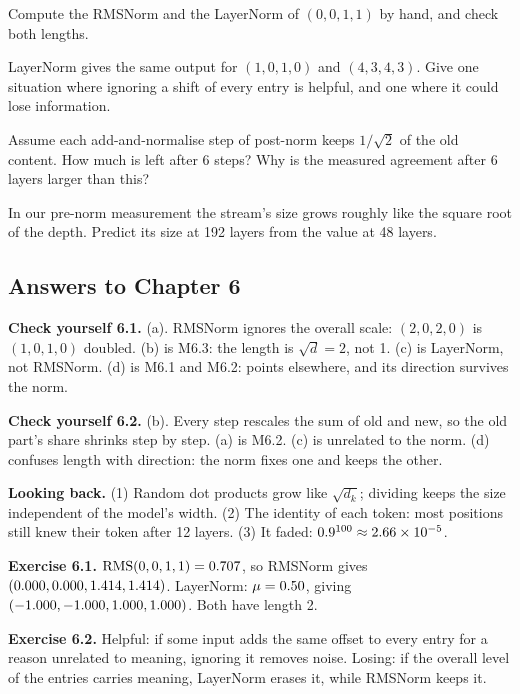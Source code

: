 \begin{exercise}
Compute the RMSNorm and the LayerNorm of $(0,0,1,1)$ by hand, and check both lengths.
\end{exercise}
\begin{exercise}
LayerNorm gives the same output for $(1,0,1,0)$ and $(4,3,4,3)$. Give one situation where ignoring a shift
of every entry is helpful, and one where it could lose information.
\end{exercise}
\begin{exercise}
Assume each add-and-normalise step of post-norm keeps $1/\sqrt2$ of the old content. How much is left after 6 steps?
Why is the measured agreement after 6 layers larger than this?
\end{exercise}
\begin{exercise}
In our pre-norm measurement the stream's size grows roughly like the square root of the depth. Predict its size at
192 layers from the value at 48 layers.
\end{exercise}

\subsection*{Answers to Chapter 6}
\small
\textbf{Check yourself 6.1.} (a). RMSNorm ignores the overall scale: $(2,0,2,0)$ is $(1,0,1,0)$ doubled. (b) is
M6.3: the length is $\sqrt d=2$, not 1. (c) is LayerNorm, not RMSNorm. (d) is M6.1 and M6.2:  points
elsewhere, and its direction survives the norm.

\textbf{Check yourself 6.2.} (b). Every step rescales the sum of old and new, so the old part's share shrinks
step by step. (a) is M6.2. (c) is unrelated to the norm. (d) confuses length with direction: the norm fixes one
and keeps the other.

\textbf{Looking back.} (1) Random dot products grow like $\sqrt{d_k}$; dividing keeps the size independent of the
model's width. (2) The identity of each token: most positions still knew their token after 12 layers. (3) It faded:
$0.9^{100}\approx2.66\times10^{-5}$.

\textbf{Exercise 6.1.} $\operatorname{RMS}(0,0,1,1)=0.707$, so RMSNorm gives $(0.000, 0.000, 1.414, 1.414)$. LayerNorm: $\mu=0.50$,
giving $(-1.000, -1.000, 1.000, 1.000)$. Both have length 2.

\textbf{Exercise 6.2.} Helpful: if some input adds the same offset to every entry for a reason unrelated to meaning,
ignoring it removes noise. Losing: if the overall level of the entries carries meaning, LayerNorm erases it, while
RMSNorm keeps it.

